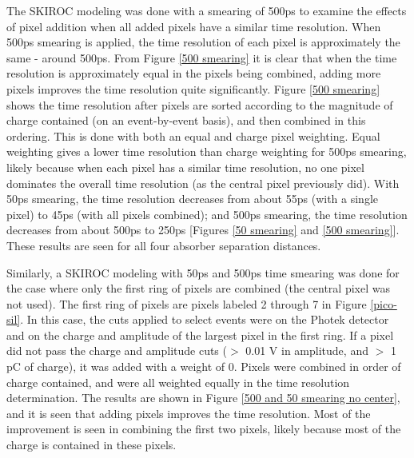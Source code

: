 \documentclass[twocolumn,aps,prd,reprint]{revtex4-1}
\begin{document}
The SKIROC modeling was done with a smearing of 500ps to examine the effects of pixel addition when all added pixels have a similar time resolution. When 500ps smearing is applied, the time resolution of each pixel is approximately the same - around 500ps. From Figure \ref{500 smearing} it is clear that when the time resolution is approximately equal in the pixels being combined, adding more pixels improves the time resolution quite significantly. Figure \ref{500 smearing} shows the time resolution after pixels are sorted according to the magnitude of charge contained (on an event-by-event basis), and then combined in this ordering. This is done with both an equal and charge pixel weighting. Equal weighting gives a lower time resolution than charge weighting for 500ps smearing, likely because when each pixel has a similar time resolution, no one pixel dominates the overall time resolution (as the central pixel previously did). With 50ps smearing, the time resolution decreases from about 55ps (with a single pixel) to 45ps (with all pixels combined); and 500ps smearing, the time resolution decreases from about 500ps to 250ps [Figures \ref{50 smearing} and \ref{500 smearing}]. These results are seen for all four absorber separation distances.

Similarly, a SKIROC modeling with 50ps and 500ps time smearing was done for the case where only the first ring of pixels are combined (the central pixel was not used). The first ring of pixels are pixels labeled 2 through 7 in Figure \ref{pico-sil}. In this case, the cuts applied to select events were on the Photek detector and on the charge and amplitude of the largest pixel in the first ring. If a pixel did not pass the charge and amplitude cuts ($>$ 0.01 V in amplitude, and $>$ 1 pC of charge), it was added with a weight of 0. Pixels were combined in order of charge contained, and were all weighted equally in the time resolution determination. The results are shown in Figure \ref{500 and 50 smearing no center}, and it is seen that adding pixels improves the time resolution. Most of the improvement is seen in combining the first two pixels, likely because most of the charge is contained in these pixels. 

\end{document}
